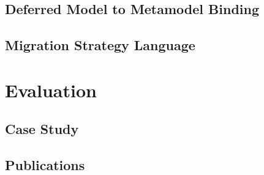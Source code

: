 \documentclass[a4paper,10pt]{article}
\begin{document}
\subsection{Deferred Model to Metamodel Binding}
\subsection{Migration Strategy Language}

\section{Evaluation}
\subsection{Case Study}
\subsection{Publications}
\end{document}
